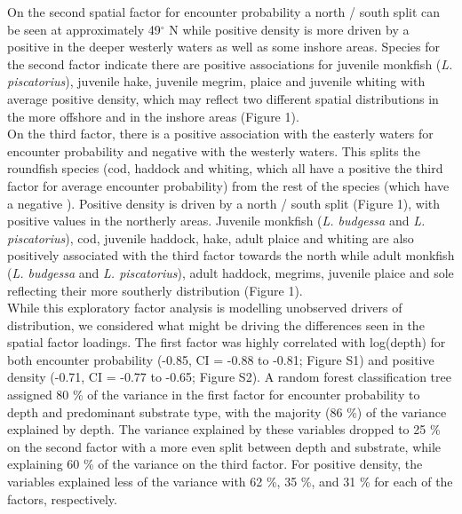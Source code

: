 \documentclass[fleqn,10pt]{wlscirep}
\begin{document}
\begin{linenumbers}
On the second spatial factor for encounter probability a north / south split
can be seen at approximately 49$^{\circ}$ N while positive density is more
driven by a positive  in the deeper
westerly waters as well as some inshore areas. Species
 for the second factor indicate there are
positive associations for juvenile monkfish (\emph{L.  piscatorius}), juvenile
hake, juvenile megrim, plaice and juvenile whiting with average positive
density, which may reflect two different spatial distributions in the more
offshore and in the inshore areas (Figure 1).\\

On the third factor, there is a positive association with the easterly waters
for encounter probability and negative with the westerly waters. This splits
the roundfish species (cod, haddock and whiting, which all have a positive
 the third factor for
average encounter probability) from the rest of the species (which have a
negative ). Positive density is
driven by a north / south split (Figure 1), with positive
 values in the northerly areas. Juvenile monkfish
(\emph{L.  budgessa} and \emph{L.  piscatorius}), cod, juvenile haddock, hake,
adult plaice and whiting are also positively associated with the third factor
towards the north while adult monkfish (\emph{L. budgessa} and \emph{L.
	piscatorius}), adult haddock, megrims, juvenile plaice and sole
reflecting their more southerly distribution (Figure 1).\\

While this exploratory factor analysis is modelling unobserved drivers of
distribution, we considered what might be driving the differences seen in the
spatial factor loadings. The first factor was highly correlated with log(depth)
for both encounter probability (-0.85, CI = -0.88 to -0.81; Figure S1) and
positive density (-0.71, CI = -0.77 to -0.65; Figure S2). A random forest
classification tree assigned 80 \% of the variance in the first factor for
encounter probability to depth and predominant substrate type, with the
majority (86 \%) of the variance explained by depth. The variance explained by
these variables dropped to 25 \% on the second factor with a more even split
between depth and substrate, while explaining 60 \% of the variance on the
third factor.  For positive density, the variables explained less of the
variance with 62 \%, 35 \%, and 31 \% for each of the factors, respectively.\\


\end{linenumbers}
\end{document}
